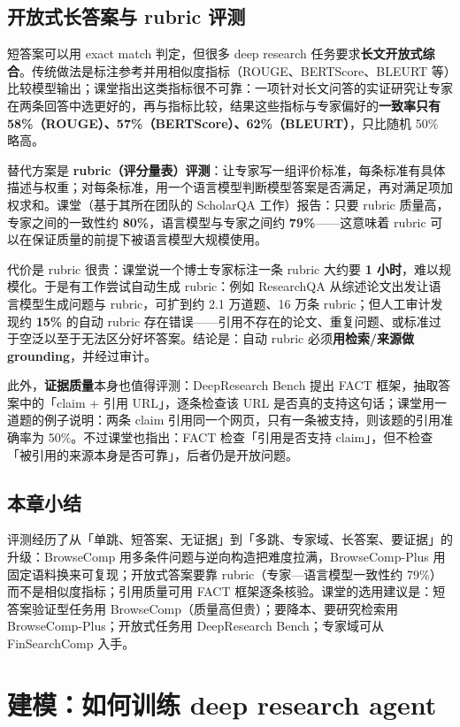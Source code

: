 \documentclass[a4paper]{article}
\begin{document}
\subsection{开放式长答案与 rubric 评测}

短答案可以用 exact match 判定，但很多 deep research 任务要求\textbf{长文开放式综合}。传统做法是标注参考并用相似度指标（ROUGE、BERTScore、BLEURT 等）比较模型输出；课堂指出这类指标很不可靠：一项针对长文问答的实证研究让专家在两条回答中选更好的，再与指标比较，结果这些指标与专家偏好的\textbf{一致率只有 58\%（ROUGE）、57\%（BERTScore）、62\%（BLEURT）}，只比随机 50\% 略高。

替代方案是 \textbf{rubric（评分量表）评测}：让专家写一组评价标准，每条标准有具体描述与权重；对每条标准，用一个语言模型判断模型答案是否满足，再对满足项加权求和。课堂（基于其所在团队的 ScholarQA 工作）报告：只要 rubric 质量高，专家之间的一致性约 \textbf{80\%}，语言模型与专家之间约 \textbf{79\%}——这意味着 rubric 可以在保证质量的前提下被语言模型大规模使用。

代价是 rubric 很贵：课堂说一个博士专家标注一条 rubric 大约要 \textbf{1 小时}，难以规模化。于是有工作尝试自动生成 rubric：例如 ResearchQA 从综述论文出发让语言模型生成问题与 rubric，可扩到约 2.1 万道题、16 万条 rubric；但人工审计发现约 \textbf{15\%} 的自动 rubric 存在错误——引用不存在的论文、重复问题、或标准过于空泛以至于无法区分好坏答案。结论是：自动 rubric 必须\textbf{用检索/来源做 grounding}，并经过审计。

此外，\textbf{证据质量}本身也值得评测：DeepResearch Bench 提出 FACT 框架，抽取答案中的「claim + 引用 URL」，逐条检查该 URL 是否真的支持这句话；课堂用一道题的例子说明：两条 claim 引用同一个网页，只有一条被支持，则该题的引用准确率为 50\%。不过课堂也指出：FACT 检查「引用是否支持 claim」，但不检查「被引用的来源本身是否可靠」，后者仍是开放问题。

\subsection{本章小结}
评测经历了从「单跳、短答案、无证据」到「多跳、专家域、长答案、要证据」的升级：BrowseComp 用多条件问题与逆向构造把难度拉满，BrowseComp-Plus 用固定语料换来可复现；开放式答案要靠 rubric（专家—语言模型一致性约 79\%）而不是相似度指标；引用质量可用 FACT 框架逐条核验。课堂的选用建议是：短答案验证型任务用 BrowseComp（质量高但贵）；要降本、要研究检索用 BrowseComp-Plus；开放式任务用 DeepResearch Bench；专家域可从 FinSearchComp 入手。

\section{建模：如何训练 deep research agent}
\end{document}
